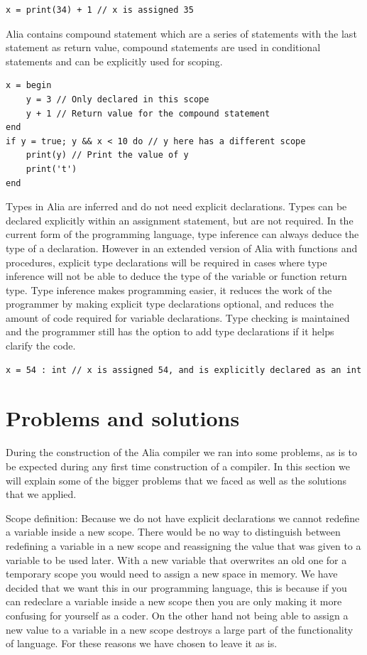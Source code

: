 \documentclass[paper=a4, fontsize=11pt]{article}
\numberwithin{equation}{section}		%
\numberwithin{figure}{section}			%
\numberwithin{table}{section}				%
\begin{document}
\begin{lstlisting}
x = print(34) + 1 // x is assigned 35
\end{lstlisting}

Alia contains compound statement which are a series of statements with the last statement as return value, compound statements are used in conditional statements and can be explicitly used for scoping.

\begin{lstlisting}
x = begin
    y = 3 // Only declared in this scope
    y + 1 // Return value for the compound statement
end
if y = true; y && x < 10 do // y here has a different scope
    print(y) // Print the value of y
    print('t')
end
\end{lstlisting}

Types in Alia are inferred and do not need explicit declarations. Types can be declared explicitly within an assignment statement, but are not required. In the current form of the programming language, type inference can always deduce the type of a declaration. However in an extended version of Alia with functions and procedures, explicit type declarations will be required in cases where type inference will not be able to deduce the type of the variable or function return type. Type inference makes programming easier, it reduces the work of the programmer by making explicit type declarations optional, and reduces the amount of code required for variable declarations. Type checking is maintained and the programmer still has the option to add type declarations if it helps clarify the code.

\begin{lstlisting}
x = 54 : int // x is assigned 54, and is explicitly declared as an int
\end{lstlisting}



\section{Problems and solutions}
During the construction of the Alia compiler we ran into some problems, as is to be expected during any first time construction of a compiler. In this section we will explain some of the bigger problems that we faced as well as the solutions that we applied.

Scope definition: Because we do not have explicit declarations we cannot redefine a variable inside a new scope. There would be no way to distinguish between redefining a variable in a new scope and reassigning the value that was given to a variable to be used later. With a new variable that overwrites an old one for a temporary scope you would need to assign a new space in memory. We have decided that we want this in our programming language, this is because if you can redeclare a variable inside a new scope then you are only making it more confusing for yourself as a coder. On the other hand not being able to assign a new value to a variable in a new scope destroys a large part of the functionality of language. For these reasons we have chosen to leave it as is.
\end{document}
